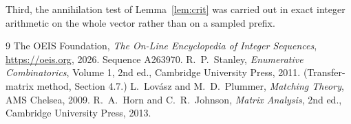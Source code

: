 \documentclass[11pt,a4paper]{article}
\theoremstyle{plain}
\theoremstyle{definition}
\begin{document}
Third, the annihilation test of Lemma~\ref{lem:crit} was carried out in exact integer
arithmetic on the whole vector rather than on a sampled prefix.

\begin{thebibliography}{9}
 The OEIS Foundation, \emph{The On-Line Encyclopedia of Integer
Sequences}, \url{https://oeis.org}, 2026. Sequence A263970.
 R.~P.~Stanley, \emph{Enumerative Combinatorics}, Volume 1, 2nd ed.,
Cambridge University Press, 2011. (Transfer-matrix method, Section 4.7.)
 L.~Lov\'asz and M.~D.~Plummer, \emph{Matching Theory}, AMS Chelsea, 2009.
 R.~A.~Horn and C.~R.~Johnson, \emph{Matrix Analysis}, 2nd ed., Cambridge
University Press, 2013.
\end{thebibliography}
\end{document}
